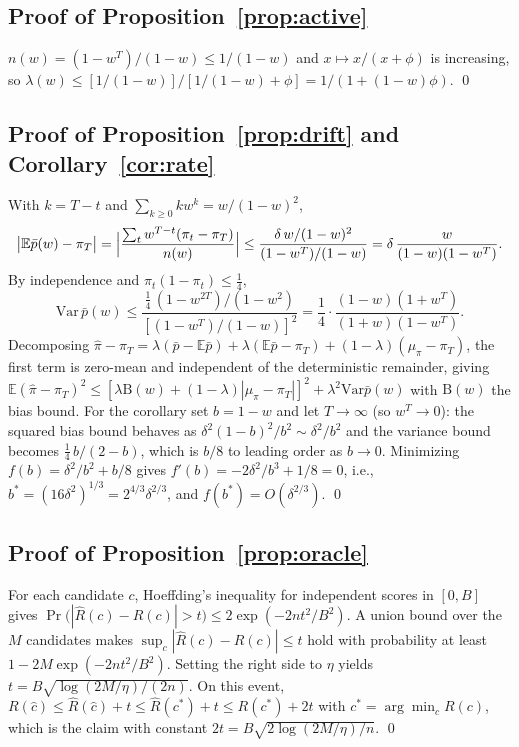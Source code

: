 \documentclass[twocolumn,10pt]{article}
\theoremstyle{definition}
\newcommand{\E}{\mathbb{E}}
\newcommand{\Var}{\mathrm{Var}}
\begin{document}
\subsection{Proof of Proposition~\ref{prop:active}}
$n(w)=(1-w^{T})/(1-w)\le1/(1-w)$ and $x\mapsto x/(x+\phi)$ is increasing,
so $\lambda(w)\le[1/(1-w)]/[1/(1-w)+\phi]=1/(1+(1-w)\phi)$. \qed

\subsection{Proof of Proposition~\ref{prop:drift} and
Corollary~\ref{cor:rate}}
With $k=T-t$ and $\sum_{k\ge0}kw^k=w/(1-w)^2$,
\[
\bigl|\E\bar p(w)-\pi_T\bigr|
=\Bigl|\frac{\sum_t w^{T-t}(\pi_t-\pi_T)}{n(w)}\Bigr|
\le\frac{\delta\,w/(1-w)^2}{(1-w^{T})/(1-w)}
=\delta\,\frac{w}{(1-w)(1-w^{T})}.
\]
By independence and $\pi_t(1-\pi_t)\le\tfrac14$,
\[
\Var\,\bar p(w)\le\frac{\tfrac14\,(1-w^{2T})/(1-w^{2})}
{[(1-w^{T})/(1-w)]^{2}}
=\frac14\cdot\frac{(1-w)(1+w^{T})}{(1+w)(1-w^{T})}.
\]
Decomposing
$\hat\pi-\pi_T=\lambda(\bar p-\E\bar p)+\lambda(\E\bar p-\pi_T)+(1-\lambda)(\mu_\pi-\pi_T)$,
the first term is zero-mean and independent of the deterministic
remainder, giving
$\E(\hat\pi-\pi_T)^2\le[\lambda\mathrm{B}(w)+(1-\lambda)|\mu_\pi-\pi_T|]^2
+\lambda^2\Var\bar p(w)$ with $\mathrm{B}(w)$ the bias bound. For the
corollary set $b=1-w$ and let $T\to\infty$ (so $w^{T}\to0$): the squared
bias bound behaves as $\delta^2(1-b)^2/b^2\sim\delta^2/b^2$ and the
variance bound becomes $\tfrac14\, b/(2-b)$, which is $b/8$ to leading
order as $b\to0$. Minimizing $f(b)=\delta^2/b^2+b/8$ gives
$f'(b)=-2\delta^2/b^3+1/8=0$, i.e.,
$b^{*}=(16\delta^{2})^{1/3}=2^{4/3}\delta^{2/3}$, and
$f(b^{*})=O(\delta^{2/3})$. \qed

\subsection{Proof of Proposition~\ref{prop:oracle}}
For each candidate $c$, Hoeffding's inequality for independent scores in
$[0,B]$ gives
$\Pr\bigl(|\hat R(c)-R(c)|>t\bigr)\le2\exp(-2nt^2/B^2)$. A union bound
over the $M$ candidates makes
$\sup_c|\hat R(c)-R(c)|\le t$ hold with probability at least
$1-2M\exp(-2nt^2/B^2)$. Setting the right side to $\eta$ yields
$t=B\sqrt{\log(2M/\eta)/(2n)}$. On this event,
$R(\hat c)\le\hat R(\hat c)+t\le\hat R(c^{*})+t\le R(c^{*})+2t$ with
$c^{*}=\arg\min_c R(c)$, which is the claim with constant
$2t=B\sqrt{2\log(2M/\eta)/n}$. \qed
\end{document}
